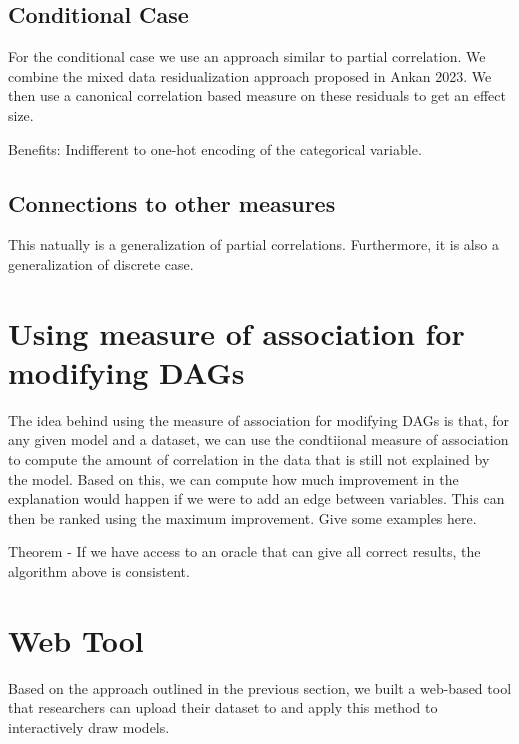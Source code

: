 \documentclass[letterpaper]{article} %
\begin{document}
\subsection{Conditional Case}
For the conditional case we use an approach similar to partial correlation. We
combine the mixed data residualization approach proposed in Ankan 2023. We then
use a canonical correlation based measure on these residuals to get an effect
size. 

Benefits: Indifferent to one-hot encoding of the categorical variable.

\subsection{Connections to other measures}
This natually is a generalization of partial correlations. Furthermore, it is 
also a generalization of discrete case.

\section{Using measure of association for modifying DAGs}
\label{sec:modification}
The idea behind using the measure of association for modifying DAGs is that,
for any given model and a dataset, we can use the condtiional measure of
association to compute the amount of correlation in the data that is still not
explained by the model. Based on this, we can compute how much improvement in
the explanation would happen if we were to add an edge between variables. This
can then be ranked using the maximum improvement. Give some examples here.

Theorem - If we have access to an oracle that can give all correct results, 
the algorithm above is consistent.

\section{Web Tool}
\label{sec:web}
Based on the approach outlined in the previous section, we built a web-based
tool that researchers can upload their dataset to and apply this method to
interactively draw models.


\end{document}
